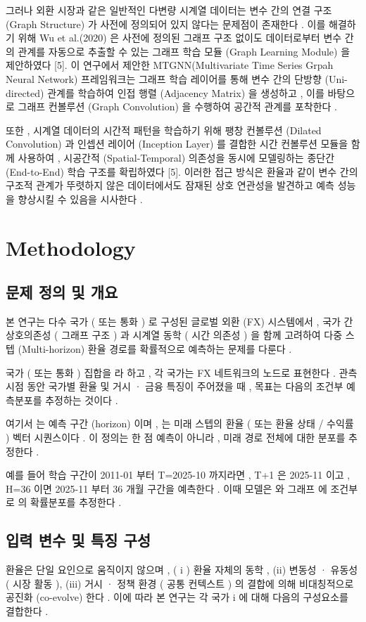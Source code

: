 \documentclass[10pt,a4paper]{article}
\begin{document}
그러나 외환 시장과 같은 일반적인 다변량 시계열 데이터는 변수 간의 연결 구조 (Graph Structure) 가 사전에 정의되어 있지 않다는 문제점이 존재한다 . 이를 해결하기 위해 Wu et al.(2020) 은 사전에 정의된 그래프 구조 없이도 데이터로부터 변수 간의 관계를 자동으로 추출할 수 있는 그래프 학습 모듈 (Graph Learning Module) 을 제안하였다 [5]. 이 연구에서 제안한 MTGNN(Multivariate Time Series Grpah Neural Network) 프레임워크는 그래프 학습 레이어를 통해 변수 간의 단방향 (Uni-directed) 관계를 학습하여 인접 행렬 (Adjacency Matrix) 을 생성하고 , 이를 바탕으로 그래프 컨볼루션 (Graph Convolution) 을 수행하여 공간적 관계를 포착한다 .

또한 , 시계열 데이터의 시간적 패턴을 학습하기 위해 팽창 컨볼루션 (Dilated Convolution) 과 인셉션 레이어 (Inception Layer) 를 결합한 시간 컨볼루션 모듈을 함께 사용하여 , 시공간적 (Spatial-Temporal) 의존성을 동시에 모델링하는 종단간 (End-to-End) 학습 구조를 확립하였다 [5]. 이러한 접근 방식은 환율과 같이 변수 간의 구조적 관계가 뚜렷하지 않은 데이터에서도 잠재된 상호 연관성을 발견하고 예측 성능을 향상시킬 수 있음을 시사한다 .

\section{Methodology}
\subsection{문제 정의 및 개요}
본 연구는 다수 국가 ( 또는 통화 ) 로 구성된 글로벌 외환 (FX) 시스템에서 , 국가 간 상호의존성 ( 그래프 구조 ) 과 시계열 동학 ( 시간 의존성 ) 을 함께 고려하여 다중 스텝 (Multi-horizon) 환율 경로를 확률적으로 예측하는 문제를 다룬다 .

국가 ( 또는 통화 ) 집합을 라 하고 , 각 국가는 FX 네트워크의 노드로 표현한다 . 관측 시점 동안 국가별 환율 및 거시 · 금융 특징이 주어졌을 때 , 목표는 다음의 조건부 예측분포를 추정하는 것이다 .

여기서 는 예측 구간 (horizon) 이며 , 는 미래 스텝의 환율 ( 또는 환율 상태 / 수익률 ) 벡터 시퀀스이다 . 이 정의는 한 점 예측이 아니라 , 미래 경로 전체에 대한 분포를 추정한다 .

예를 들어 학습 구간이 2011-01 부터 T=2025-10 까지라면 , T+1 은 2025-11 이고 , H=36 이면 2025-11 부터 36 개월 구간을 예측한다 . 이때 모델은 와 그래프 에 조건부로 의 확률분포를 추정한다 .

\subsection{입력 변수 및 특징 구성}
환율은 단일 요인으로 움직이지 않으며 , ( i ) 환율 자체의 동학 , (ii) 변동성 · 유동성 ( 시장 활동 ), (iii) 거시 · 정책 환경 ( 공통 컨텍스트 ) 의 결합에 의해 비대칭적으로 공진화 (co-evolve) 한다 . 이에 따라 본 연구는 각 국가 i 에 대해 다음의 구성요소를 결합한다 .
\end{document}
